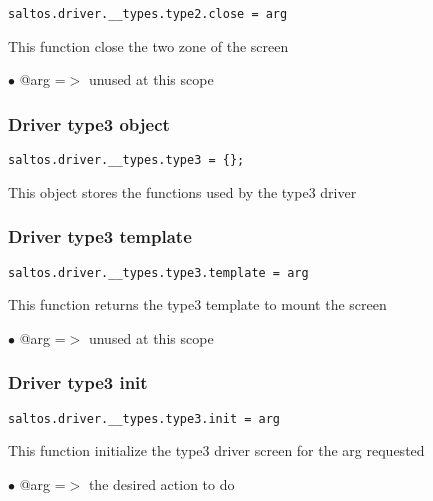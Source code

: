 \documentclass[a4paper]{article}
\begin{document}
\begin{lstlisting}
saltos.driver.__types.type2.close = arg
\end{lstlisting}

This function close the two zone of the screen

\begin{compactitem}
\item[\color{myblue}$\bullet$] @arg =$>$ unused at this scope
\end{compactitem}

\hypertarget{toc749}{}
\subsubsection{Driver type3 object}

\begin{lstlisting}
saltos.driver.__types.type3 = {};
\end{lstlisting}

This object stores the functions used by the type3 driver

\hypertarget{toc750}{}
\subsubsection{Driver type3 template}

\begin{lstlisting}
saltos.driver.__types.type3.template = arg
\end{lstlisting}

This function returns the type3 template to mount the screen

\begin{compactitem}
\item[\color{myblue}$\bullet$] @arg =$>$ unused at this scope
\end{compactitem}

\hypertarget{toc751}{}
\subsubsection{Driver type3 init}

\begin{lstlisting}
saltos.driver.__types.type3.init = arg
\end{lstlisting}

This function initialize the type3 driver screen for the arg requested

\begin{compactitem}
\item[\color{myblue}$\bullet$] @arg =$>$ the desired action to do
\end{compactitem}
\end{document}
